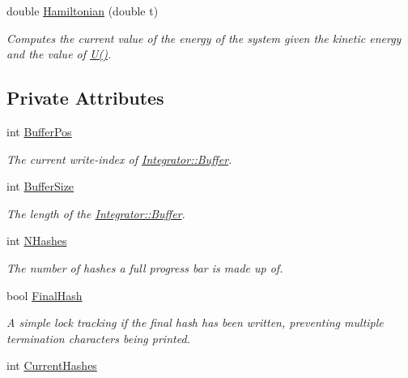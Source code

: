 \begin{DoxyCompactItemize}
double \hyperlink{classQDynamics_1_1Integrator_a816743f6efb41b0b29243ff3bdaa4c9d}{Hamiltonian} (double t)
\begin{DoxyCompactList}\small\item\em Computes the current value of the energy of the system given the kinetic energy and the value of \hyperlink{classQDynamics_1_1Integrator_afa838ba8dfb0fbde1f77c6d2a45a9dd0}{U()}. \end{DoxyCompactList}\end{DoxyCompactItemize}
\subsection*{Private Attributes}
\begin{DoxyCompactItemize}
\item 
int \hyperlink{classQDynamics_1_1Integrator_ae62176188110c0dcea7c65ba429d1abe}{Buffer\+Pos}
\begin{DoxyCompactList}\small\item\em The current write-\/index of \hyperlink{classQDynamics_1_1Integrator_af8889c2bbe10237a8dd8c46b25b15d29}{Integrator\+::\+Buffer}. \end{DoxyCompactList}\item 
int \hyperlink{classQDynamics_1_1Integrator_acbafc2a1b2b19f230c6dfd8924cb36dd}{Buffer\+Size}
\begin{DoxyCompactList}\small\item\em The length of the \hyperlink{classQDynamics_1_1Integrator_af8889c2bbe10237a8dd8c46b25b15d29}{Integrator\+::\+Buffer}. \end{DoxyCompactList}\item 
int \hyperlink{classQDynamics_1_1Integrator_a00be60876ae62ef0d1555a6cc0ce52a5}{N\+Hashes}
\begin{DoxyCompactList}\small\item\em The number of hashes a full progress bar is made up of. \end{DoxyCompactList}\item 
bool \hyperlink{classQDynamics_1_1Integrator_ae893dd6b0d041de777e25a99f42886c3}{Final\+Hash}
\begin{DoxyCompactList}\small\item\em A simple lock tracking if the final hash has been written, preventing multiple termination characters being printed. \end{DoxyCompactList}\item 
int \hyperlink{classQDynamics_1_1Integrator_abab707f49ba0ae6701db5dbcdf86861f}{Current\+Hashes}

\end{DoxyCompactItemize}
